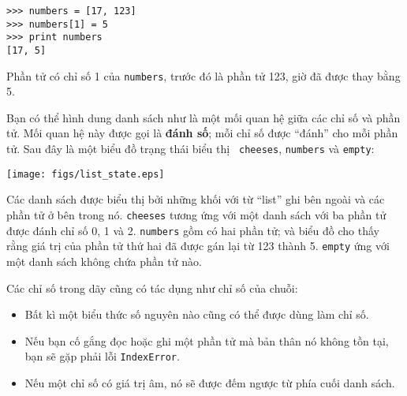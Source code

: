 \documentclass[11pt]{book}
\begin{document}

\beforeverb
\begin{verbatim}
>>> numbers = [17, 123]
>>> numbers[1] = 5
>>> print numbers
[17, 5]
\end{verbatim}
\afterverb
%
Phần tử có chỉ số 1 của {\tt numbers}, trước đó là phần tử 123,
giờ đã được thay bằng 5.


Bạn có thể hình dung danh sách như là một mối quan hệ giữa các
chỉ số và phần tử. Mối quan hệ này được gọi là {\bf đánh số}; mỗi chỉ số
được ``đánh'' cho mỗi phần tử. Sau đây là một biểu đồ trạng thái biểu thị {\tt
cheeses}, {\tt numbers} và {\tt empty}:


\beforefig
\centerline{\texttt{[image: figs/list\_state.eps]}}
\afterfig

Các danh sách được biểu thị bởi những khối với từ ``list'' ghi bên ngoài
và các phần tử ở bên trong nó. {\tt cheeses} tương ứng với một danh sách
với ba phần tử được đánh chỉ số 0, 1 và 2.
{\tt numbers} gồm có hai phần tử; và biểu đồ cho thấy rằng giá trị của
phần tử thứ hai đã được gán lại từ 123 thành 5.
{\tt empty} ứng với một danh sách không chứa phần tử nào.


Các chỉ số trong dãy cũng có tác dụng như chỉ số của chuỗi:

\begin{itemize}

\item Bất kì một biểu thức số nguyên nào cũng có thể được dùng làm
chỉ số.

\item Nếu bạn cố gắng đọc hoặc ghi một phần tử mà bản thân nó không tồn tại,
bạn sẽ gặp phải lỗi {\tt IndexError}.


\item Nếu một chỉ số có giá trị âm, nó sẽ được đếm ngược từ phía cuối danh sách.

\end{itemize}



\end{document}
